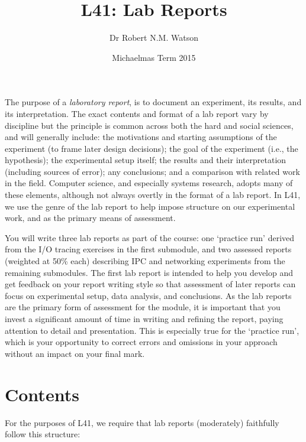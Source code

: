 \documentclass[a4paper,10pt]{article}
\begin{document}
\title{L41: Lab Reports}
\author{Dr Robert N.M. Watson}
\date{Michaelmas Term 2015}
\maketitle

The purpose of a \textit{laboratory report}, is to document an experiment, its
results, and its interpretation.
The exact contents and format of a lab report vary by discipline but the
principle is common across both the hard and social sciences, and will
generally include: the motivations and starting assumptions of the experiment
(to frame later design decisions); the goal of the experiment (i.e., the
hypothesis); the experimental setup itself; the results and their
interpretation (including sources of error); any conclusions; and a
comparison with related work in the field.
Computer science, and especially systems research, adopts many of these
elements, although not always overtly in the format of a lab report.
In L41, we use the genre of the lab report to help impose structure on our
experimental work, and as the primary means of assessment.

You will write three lab reports as part of the course: one `practice run'
derived from the I/O tracing exercises in the first submodule, and two
assessed reports (weighted at 50\% each) describing IPC and networking
experiments from the remaining submodules.
The first lab report is intended to help you develop and get feedback on your
report writing style so that assessment of later reports can focus on
experimental setup, data analysis, and conclusions.
As the lab reports are the primary form of assessment for the module, it is
important that you invest a significant amount of time in writing and refining
the report, paying attention to detail and presentation.
This is especially true for the `practice run', which is your opportunity to
correct errors and omissions in your approach without an impact on your final
mark.

\section*{Contents}

For the purposes of L41, we require that lab reports (moderately) faithfully
follow this structure:
\end{document}
